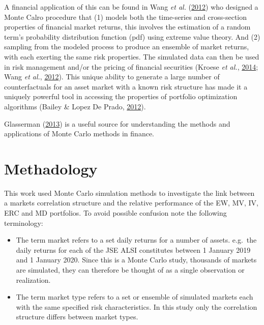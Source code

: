 \documentclass[11pt,preprint, authoryear]{elsarticle}
\numberwithin{equation}{section}
\numberwithin{figure}{section}
\numberwithin{table}{section}
\def\tightlist{} %
\begin{document}
A financial application of this can be found in Wang \emph{et al.}
(\protect\hyperlink{ref-wang2012}{2012}) who designed a Monte Calro
procedure that (1) models both the time-series and cross-section
properties of financial market returns, this involves the estimation of
a random term's probability distribution function (pdf) using extreme
value theory. And (2) sampling from the modeled process to produce an
ensemble of market returns, with each exerting the same risk properties.
The simulated data can then be used in risk management and/or the
pricing of financial securities (Kroese \emph{et al.},
\protect\hyperlink{ref-kroese2014}{2014}; Wang \emph{et al.},
\protect\hyperlink{ref-wang2012}{2012}). This unique ability to generate
a large number of counterfactuals for an asset market with a known risk
structure has made it a uniquely powerful tool in accessing the
properties of portfolio optimization algorithms (Bailey \& Lopez De
Prado, \protect\hyperlink{ref-lopez2012}{2012}).

Glasserman (\protect\hyperlink{ref-glasserman2013}{2013}) is a useful
source for understanding the methods and applications of Monte Carlo
methods in finance.

\hypertarget{methadology}{%
\section{\texorpdfstring{Methadology
\label{methadology}}{Methadology }}\label{methadology}}

This work used Monte Carlo simulation methods to investigate the link
between a markets correlation structure and the relative performance of
the EW, MV, IV, ERC and MD portfolios. To avoid possible confusion note
the following terminology:

\begin{itemize}
\tightlist
\item
  The term market refers to a set daily returns for a number of assets.
  e.g.~the daily returns for each of the JSE ALSI constitutes between 1
  January 2019 and 1 January 2020. Since this is a Monte Carlo study,
  thousands of markets are simulated, they can therefore be thought of
  as a single observation or realization.
\item
  The term market type refers to a set or ensemble of simulated markets
  each with the same specified risk characteristics. In this study only
  the correlation structure differs between market types.
\end{itemize}
\end{document}
